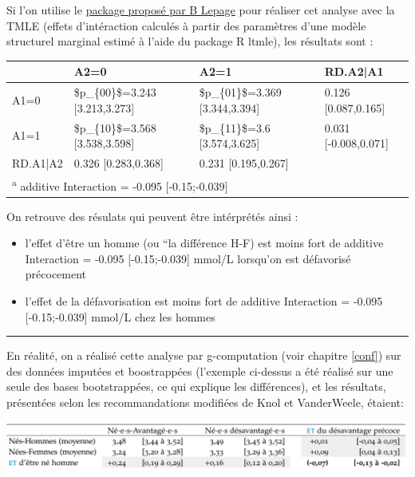 \documentclass[
]{book}
\providecommand{\tightlist}{%
  \setlength{\itemsep}{0pt}\setlength{\parskip}{0pt}}
\begin{document}
Si l'on utilise le \href{https://github.com/benoitlepage/MargIntTmle}{package proposé par B Lepage} pour réaliser cet analyse avec la TMLE (effets d'intéraction calculés à partir des paramètres d'une modèle structurel marginal estimé à l'aide du package R ltmle), les résultats sont :

\begin{table}
\centering
\begin{tabular}{l|l|l|l}
\hline
  & A2=0 & A2=1 & RD.A2|A1\\
\hline
A1=0 & \$p\_\{00\}\$=3.243 [3.213,3.273] & \$p\_\{01\}\$=3.369 [3.344,3.394] & 0.126 [0.087,0.165]\\
\hline
A1=1 & \$p\_\{10\}\$=3.568 [3.538,3.598] & \$p\_\{11\}\$=3.6 [3.574,3.625] & 0.031 [-0.008,0.071]\\
\hline
RD.A1|A2 & 0.326 [0.283,0.368] & 0.231 [0.195,0.267] & \\
\hline
\multicolumn{4}{l}{\textsuperscript{a} additive Interaction = -0.095 [-0.15;-0.039]}\\
\end{tabular}
\end{table}

On retrouve des résulats qui peuvent être intérprétés ainsi :

\begin{itemize}
\tightlist
\item
  l'effet d'être un homme (ou ``la différence H-F) est moins fort de additive Interaction = -0.095 {[}-0.15;-0.039{]} mmol/L lorsqu'on est défavorisé précocement
\item
  l'effet de la défavorisation est moins fort de additive Interaction = -0.095 {[}-0.15;-0.039{]} mmol/L chez les hommes
\end{itemize}

\begin{center}\rule{0.5\linewidth}{0.5pt}\end{center}

En réalité, on a réalisé cette analyse par g-computation (voir chapitre \ref{conf}) sur des données imputées et boostrappées (l'exemple ci-dessus a été réalisé sur une seule des bases bootstrappées, ce qui explique les différences), et les résultats, présentées selon les recommandations modifiées de Knol et VanderWeele, étaient:

\includegraphics[width=1\textwidth,height=\textheight]{img/result_quanti.png}
\end{document}
